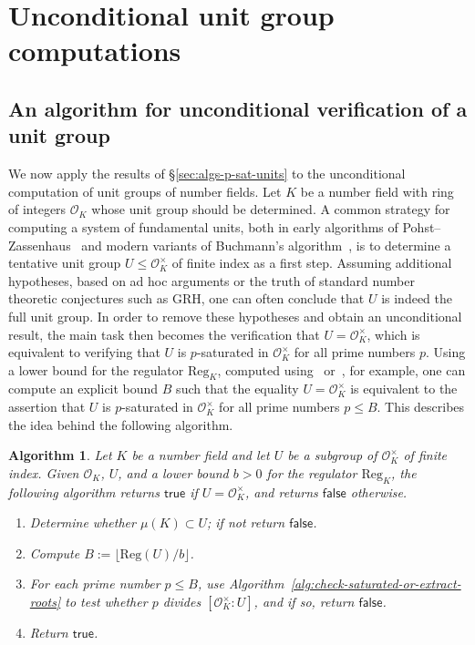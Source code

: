 \documentclass[12pt, a4paper, usenames]{amsart}
\renewcommand{\theenumi}{\alph{enumi}}
\theoremstyle{plain}
\newtheorem{algorithm}[theorem]{Algorithm}
\theoremstyle{remark}
\theoremstyle{definition}
\begin{document}
\section{Unconditional unit group computations}\label{sec:unconditional-unit-group-comp}

\subsection{An algorithm for unconditional verification of a unit group}
We now apply the results of \S \ref{sec:algs-p-sat-units} to the 
unconditional computation of unit groups of number fields. 
Let $K$ be a number field with ring of integers $\mathcal{O}_{K}$ whose unit group should be determined.
A common strategy for computing a system of fundamental units, both in early algorithms of Pohst--Zassenhaus~\cite{MR498486} and modern variants of Buchmann's algorithm~\cite{MR1104698}, is to determine a tentative unit group 
$U \leq \mathcal{O}_{K}^{\times}$ of finite index as a first step.
Assuming additional hypotheses, based on ad hoc arguments or the truth of standard number theoretic conjectures such as GRH,
one can often conclude that $U$ is indeed the full unit group.
In order to remove these hypotheses and obtain an unconditional result, the main task then becomes the verification that $U = \mathcal{O}_{K}^{\times}$, 
which is equivalent to verifying that $U$ is 
$p$-saturated in $\mathcal{O}_{K}^{\times}$ for all prime numbers $p$.
Using a lower bound for the regulator $\mathrm{Reg}_{K}$, 
computed using~\cite{MR604833} or~\cite{MR2441075}, for example,
one can compute an explicit bound $B$ such that the equality 
$U = \mathcal{O}_{K}^{\times}$ is equivalent to the 
assertion that $U$ is $p$-saturated in $\mathcal{O}_{K}^{\times}$
for all prime numbers $p \leq B$. This describes the idea behind the following algorithm.

\begin{algorithm}\label{alg:unit-group-verification}
Let $K$ be a number field and let $U$ be a subgroup of
$\mathcal{O}_{K}^{\times}$ of finite index. 
Given $\mathcal{O}_{K}$, $U$, and a lower bound $b>0$ for the regulator
$\mathrm{Reg}_{K}$, the following algorithm returns 
\ensuremath{\mathsf{true}} if $U=\mathcal{O}_{K}^{\times}$,
and returns \ensuremath{\mathsf{false}} otherwise. 
\renewcommand{\theenumi}{\arabic{enumi}}
\renewcommand{\labelenumi}{(\theenumi)}
\begin{enumerate}
\item Determine whether $\mu(K) \subset U$; if not return \ensuremath{\mathsf{false}}.
\item Compute $B := \lfloor \mathrm{Reg}(U)/b \rfloor$.
\item For each prime number $p \leq B$, 
use Algorithm~\ref{alg:check-saturated-or-extract-roots}
to test whether $p$ divides $[\mathcal{O}_{K}^{\times} : U]$, and if so, 
return \ensuremath{\mathsf{false}}.
\item Return \ensuremath{\mathsf{true}}. 
\end{enumerate}
\end{algorithm}
\end{document}
